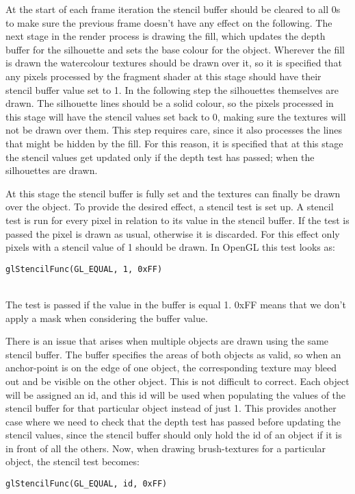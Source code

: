 \documentclass[a4paper, 12pt]{article}
\begin{document}
At the start of each frame iteration the stencil buffer should be cleared to all 0s to make sure the previous frame doesn't have any effect on the following. The next stage in the render process is drawing the fill, which updates the depth buffer for the silhouette and sets the base colour for the object. Wherever the fill is drawn the watercolour textures should be drawn over it, so it is specified that any pixels processed by the fragment shader at this stage should have their stencil buffer value set to 1. In the following step the silhouettes themselves are drawn. The silhouette lines should be a solid colour, so the pixels processed in this stage will have the stencil values set back to 0, making sure the textures will not be drawn over them. This step requires care, since it also processes the lines that might be hidden by the fill. For this reason, it is specified that at this stage the stencil values get updated only if the depth test has passed; when the silhouettes are drawn.

At this stage the stencil buffer is fully set and the textures can finally be drawn over the object. To provide the desired effect, a stencil test is set up. A stencil test is run for every pixel in relation to its value in the stencil buffer. If the test is passed the pixel is drawn as usual, otherwise it is discarded. For this effect only pixels with a stencil value of 1 should be drawn. In OpenGL this test looks as:\\
\centerline{\texttt{glStencilFunc(GL\_EQUAL, 1, 0xFF)\;}}\\
The test is passed if the value in the buffer is equal 1. 0xFF means that we don't apply a mask when considering the buffer value.

There is an issue that arises when multiple objects are drawn using the same stencil buffer. The buffer specifies the areas of both objects as valid, so when an anchor-point is on the edge of one object, the corresponding texture may bleed out and be visible on the other object. This is not difficult to correct. Each object will be assigned an id, and this id will be used when populating the values of the stencil buffer for that particular object instead of just 1. This provides another case where we need to check that the depth test has passed before updating the stencil values, since the stencil buffer should only hold the id of an object if it is in front of all the others. Now, when drawing brush-textures for a particular object, the stencil test becomes:\\
\centerline{\texttt{glStencilFunc(GL\_EQUAL, id, 0xFF)\;}}\\
\end{document}
